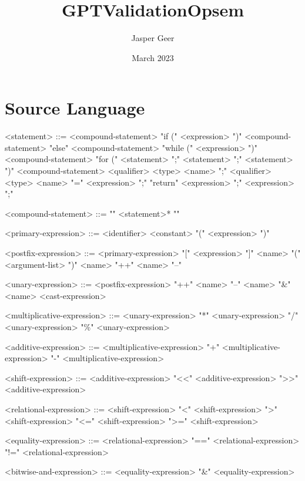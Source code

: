 \documentclass{article}
\title{GPTValidationOpsem}
\author{Jasper Geer}
\date{March 2023}
\begin{document}

\section{Source Language}
\begin{grammar}
<statement> ::= <compound-statement>
  \alt "if (" <expression> ")" <compound-statement> "else" <compound-statement>
  \alt "while (" <expression> ")" <compound-statement>
  \alt "for (" <statement> ";" <statement> ";" <statement> ")" <compound-statement>
  \alt <qualifier> <type> <name> ";"
  \alt <qualifier> <type> <name> "=" <expression> ";"
  \alt "return" <expression> ";"
  \alt <expression> ";"

<compound-statement> ::= "{" <statement>* "}"

<primary-expression> ::= <identifier>
  \alt <constant>
  \alt "(" <expression> ")"

<postfix-expression> ::= <primary-expression>
   "[" <expression> "]"
  \alt <name> "(" <argument-list> ")"
  \alt <name> "++"
  \alt <name> "--"

<unary-expression> ::= <postfix-expression>
  \alt "++" <name>
  \alt "--" <name>
  \alt "&" <name>
   <cast-expression>

<multiplicative-expression> ::= <unary-expression>
   "*" <unary-expression>
   "/" <unary-expression>
   "\%" <unary-expression>

<additive-expression> ::= <multiplicative-expression>
   "+" <multiplicative-expression>
   "-" <multiplicative-expression>

<shift-expression> ::= <additive-expression>
   "<<" <additive-expression>
   ">>" <additive-expression>
  
<relational-expression> ::= <shift-expression>
   "<" <shift-expression>
   ">" <shift-expression>
   "<=" <shift-expression>
   ">=" <shift-expression>

<equality-expression> ::= <relational-expression>
   "==" <relational-expression>
   "!=" <relational-expression>

<bitwise-and-expression> ::= <equality-expression>
   "&" <equality-expression>


\end{grammar}
\end{document}

